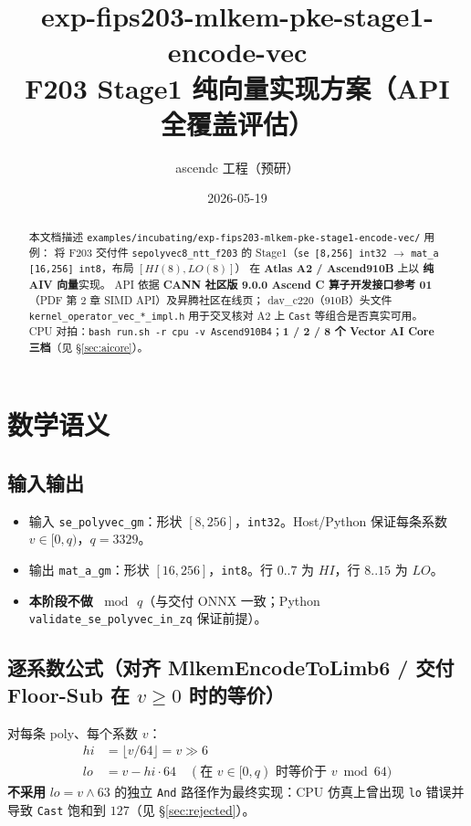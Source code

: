 \documentclass[UTF8,a4paper,11pt]{ctexart}
\title{exp-fips203-mlkem-pke-stage1-encode-vec\\F203 Stage1 纯向量实现方案（API 全覆盖评估）}
\author{ascendc 工程（预研）}
\date{2026-05-19}
\begin{document}
\maketitle

\begin{abstract}
本文档描述 \texttt{examples/incubating/exp-fips203-mlkem-pke-stage1-encode-vec/} 用例：
将 F203 交付件 \texttt{sepolyvec8\_ntt\_f203} 的 Stage1（\texttt{se [8,256] int32} $\rightarrow$ \texttt{mat\_a [16,256] int8}，布局 $[HI(8),LO(8)]$）
在 \textbf{Atlas A2 / Ascend910B} 上以 \textbf{纯 AIV 向量}实现。
API 依据 \textbf{CANN 社区版 9.0.0 Ascend C 算子开发接口参考 01}（PDF 第 2 章 SIMD API）及昇腾社区在线页；
dav\_c220（910B）头文件 \texttt{kernel\_operator\_vec\_*\_impl.h} 用于交叉核对 A2 上 \texttt{Cast} 等组合是否真实可用。
CPU 对拍：\texttt{bash run.sh -r cpu -v Ascend910B4}；\textbf{1 / 2 / 8 个 Vector AI Core 三档}（见 §\ref{sec:aicore}）。
\end{abstract}

\tableofcontents
\newpage

\section{数学语义}

\subsection{输入输出}
\begin{itemize}
  \item 输入 \texttt{se\_polyvec\_gm}：形状 $[8,256]$，\texttt{int32}。Host/Python 保证每条系数 $v \in [0,q)$，$q=3329$。
  \item 输出 \texttt{mat\_a\_gm}：形状 $[16,256]$，\texttt{int8}。行 $0..7$ 为 $HI$，行 $8..15$ 为 $LO$。
  \item \textbf{本阶段不做 $\bmod\,q$}（与交付 ONNX 一致；Python \texttt{validate\_se\_polyvec\_in\_zq} 保证前提）。
\end{itemize}

\subsection{逐系数公式（对齐 MlkemEncodeToLimb6 / 交付 Floor-Sub 在 $v\ge0$ 时的等价）}
对每条 poly、每个系数 $v$：
\begin{align}
  hi &= \lfloor v / 64 \rfloor = v \gg 6 \\
  lo &= v - hi \cdot 64 \quad (\text{在 } v\in[0,q) \text{ 时等价于 } v \bmod 64)
\end{align}
\textbf{不采用} $lo = v \land 63$ 的独立 \texttt{And} 路径作为最终实现：CPU 仿真上曾出现 \texttt{lo} 错误并导致 \texttt{Cast} 饱和到 $127$（见 §\ref{sec:rejected}）。
\end{document}
